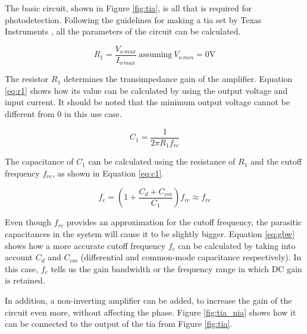 The basic circuit, shown in Figure \ref{fig:tia}, is all that is required for photodetection. Following the guidelines for making a \gls{tia} set by Texas Instruments \cite{semig24}, all the parameters of the circuit can be calculated.

\begin{equation}\label{eq:r1}
	R_1 = \frac{V_{o\ max}}{I_{o\ max}}\ \text{assuming}\ V_{o\ min} = 0 \unit{\volt}
\end{equation}

The resistor $R_1$ determines the transimpedance gain of the amplifier. Equation \ref{eq:r1} shows how its value can be calculated by using the output voltage and input current. It should be noted that the minimum output voltage cannot be different from 0 in this use case.

\begin{equation}\label{eq:c1}
	C_1 = \frac{1}{2 \pi R_1 f_{rc}}
\end{equation}

The capacitance of $C_1$ can be calculated using the resistance of $R_1$ and the cutoff frequency $f_{rc}$, as shown in Equation \ref{eq:c1}. 

\begin{equation}\label{eq:gbw}
	f_{c} = (1 + \frac{C_d + C_{cm}}{C_1})f_{rc} \approx f_{rc}
\end{equation}

Even though $f_{rc}$ provides an approximation for the cutoff frequency, the parasitic capacitances in the system will cause it to be slightly bigger. Equation \ref{eq:gbw} shows how a more accurate cutoff frequency $f_c$ can be calculated by taking into account $C_d$ and $C_{cm}$ (differential and common-mode capacitance respectively). In this case, $f_c$ tells us the gain bandwidth or the frequency range in which DC gain is retained.

In addition, a non-inverting amplifier can be added, to increase the gain of the circuit even more, without affecting the phase. Figure \ref{fig:tia_nia} shows how it can be connected to the output of the \gls{tia} from Figure \ref{fig:tia}.

